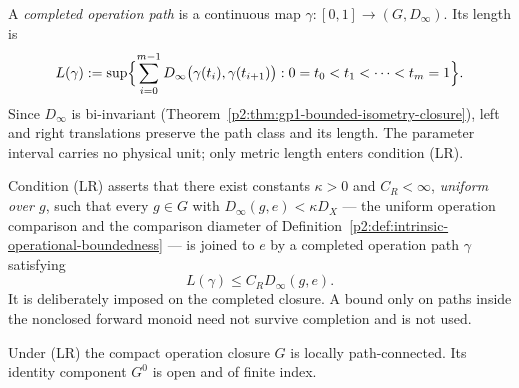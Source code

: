 \documentclass[11pt,a4paper]{article}
\begin{document}
\begin{definition}
\label{p2:def:generated-operation-path}
A \emph{completed operation path} is a continuous map
\(\gamma:[0,1]\to(G,D_\infty)\).  Its length is
\[
 L(\gamma):=\sup\Bigl\{\sum_{i=0}^{m-1}
 D_\infty\bigl(\gamma(t_i),\gamma(t_{i+1})\bigr):
 0=t_0<t_1<\dots<t_m=1\Bigr\}.
\]
Since \(D_\infty\) is bi-invariant
(Theorem~\ref{p2:thm:gp1-bounded-isometry-closure}), left and right
translations preserve the path class and its length.  The parameter interval
carries no physical unit; only metric length enters condition (LR).
\end{definition}

\begin{definition}
\label{p2:def:local-rectifiable-reachability}
Condition (LR) asserts that there exist constants \(\kappa>0\) and
\(C_R<\infty\), \emph{uniform over \(g\)}, such that every \(g\in G\) with
\(D_\infty(g,e)<\kappa D_X\) --- the uniform operation comparison and the
comparison diameter of
Definition~\ref{p2:def:intrinsic-operational-boundedness} --- is joined to
\(e\) by a completed operation
path \(\gamma\) satisfying
\[
 L(\gamma)\le C_R D_\infty(g,e).
\]
It is deliberately imposed on the completed closure.  A bound only on paths
inside the nonclosed forward monoid need not survive completion and is not
used.
\end{definition}

\begin{theorem}
\label{p2:thm:gp1-reachability-local-connectedness}
Under (LR) the compact operation closure \(G\) is locally
path-connected.  Its identity component \(G^0\) is open and of finite
index.
\end{theorem}
\end{document}
